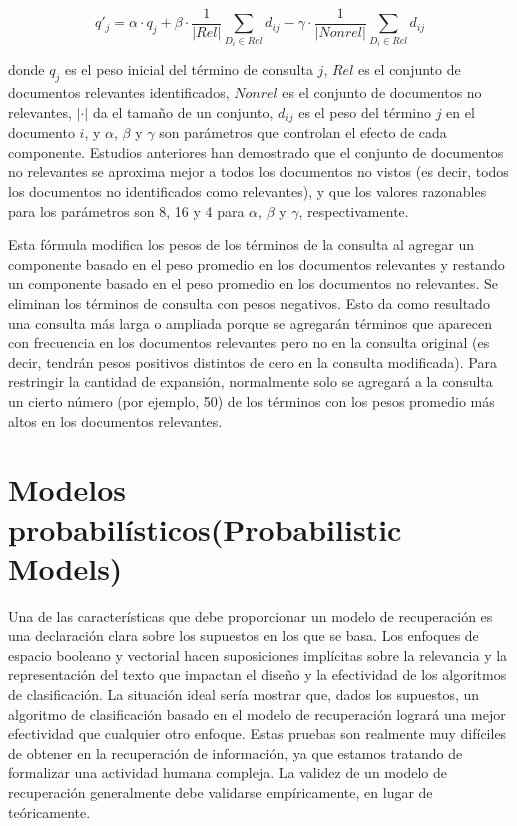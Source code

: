 $$q'_j = \alpha \cdot q_j + \beta\cdot \frac{1}{|Rel|} \sum_{D_i \in Rel} d_{ij} - \gamma\cdot \frac{1}{|Nonrel|} \sum_{D_i \in Rel}d_{ij}  $$

donde $q_j$ es el peso inicial del término de consulta $j$, $Rel$ es el conjunto de documentos relevantes identificados, $Nonrel$ es el conjunto de documentos no relevantes, $|\cdot |$ da el tamaño de un conjunto, $d_{ij}$ es el peso del término $j$ en el documento $i$, y $\alpha$, $\beta$ y $\gamma$ son parámetros que controlan el efecto de cada componente. Estudios anteriores han demostrado que el conjunto de documentos no relevantes se aproxima mejor a todos los documentos no vistos (es decir, todos los documentos no identificados como relevantes), y que los valores razonables para los parámetros son 8, 16 y 4 para $\alpha$, $\beta$ y $\gamma$, respectivamente.

Esta fórmula modifica los pesos de los términos de la consulta al agregar un componente basado en el peso promedio en los documentos relevantes y restando un componente basado en el peso promedio en los documentos no relevantes. Se eliminan los términos de consulta con pesos negativos. Esto da como resultado una consulta más larga o ampliada porque se agregarán términos que aparecen con frecuencia en los documentos relevantes pero no en la consulta original (es decir, tendrán pesos positivos distintos de cero en la consulta modificada). Para restringir la cantidad de expansión, normalmente solo se agregará a la consulta un cierto número (por ejemplo, 50) de los términos con los pesos promedio más altos en los documentos relevantes.

\section{Modelos probabilísticos(Probabilistic Models)}

Una de las características que debe proporcionar un modelo de recuperación es una declaración clara sobre los supuestos en los que se basa. Los enfoques de espacio booleano y vectorial hacen suposiciones implícitas sobre la relevancia y la representación del texto que impactan el diseño y la efectividad de los algoritmos de clasificación. La situación ideal sería mostrar que, dados los supuestos, un algoritmo de clasificación basado en el modelo de recuperación logrará una mejor efectividad que cualquier otro enfoque. Estas pruebas son realmente muy difíciles de obtener en la recuperación de información, ya que estamos tratando de formalizar una actividad humana compleja. La validez de un modelo de recuperación generalmente debe validarse empíricamente, en lugar de teóricamente.

